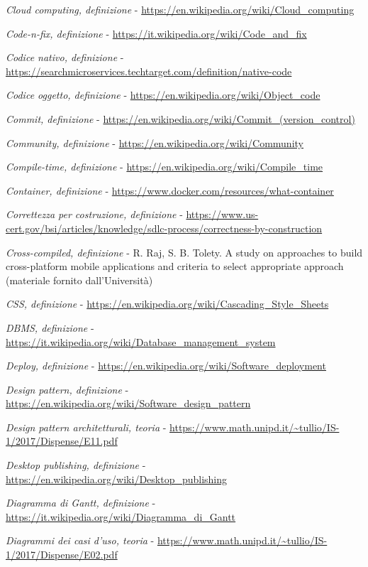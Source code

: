 \begin{enumerate}[label={[\arabic*]}]
	\item \textit{Cloud computing, definizione} - \url{https://en.wikipedia.org/wiki/Cloud_computing}
	\item \textit{Code-n-ﬁx, definizione} - \url{https://it.wikipedia.org/wiki/Code_and_fix}
	\item \textit{Codice nativo, definizione} - \url{https://searchmicroservices.techtarget.com/definition/native-code}
	\item \textit{Codice oggetto, definizione} - \url{https://en.wikipedia.org/wiki/Object_code}
	\item \textit{Commit, definizione} - \url{https://en.wikipedia.org/wiki/Commit_(version_control)}
	\item \textit{Community, definizione} - \url{https://en.wikipedia.org/wiki/Community}
	\item \textit{Compile-time, definizione} - \url{https://en.wikipedia.org/wiki/Compile_time}
	\item \textit{Container, definizione} - \url{https://www.docker.com/resources/what-container}
	\item \textit{Correttezza per costruzione, definizione} - \url{https://www.us-cert.gov/bsi/articles/knowledge/sdlc-process/correctness-by-construction}
	\item \textit{Cross-compiled, definizione} - R. Raj, S. B. Tolety. A study on approaches to build cross-platform mobile applications and criteria to select appropriate approach (materiale fornito dall'Università)
	\item \textit{CSS, definizione} - \url{https://en.wikipedia.org/wiki/Cascading_Style_Sheets}
	\item \textit{DBMS, definizione} - \url{https://it.wikipedia.org/wiki/Database_management_system}
	\item \textit{Deploy, definizione} - \url{https://en.wikipedia.org/wiki/Software_deployment}
	\item \textit{Design pattern, definizione} - \url{https://en.wikipedia.org/wiki/Software_design_pattern}
	\item \textit{Design pattern architetturali, teoria} - \url{https://www.math.unipd.it/~tullio/IS-1/2017/Dispense/E11.pdf}
	\item \textit{Desktop publishing, definizione} - \url{https://en.wikipedia.org/wiki/Desktop_publishing}
	\item \textit{Diagramma di Gantt, definizione} - \url{https://it.wikipedia.org/wiki/Diagramma_di_Gantt}
	\item \textit{Diagrammi dei casi d'uso, teoria} - \url{https://www.math.unipd.it/~tullio/IS-1/2017/Dispense/E02.pdf}

\end{enumerate}
